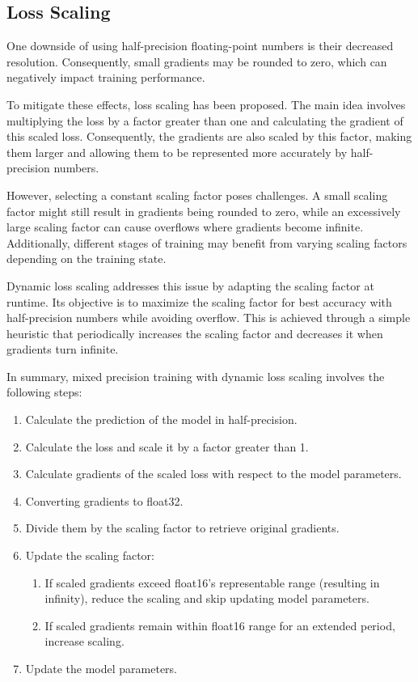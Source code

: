 \documentclass[logo]{dsme}
\begin{document}
\subsection{Loss Scaling}
One downside of using half-precision floating-point numbers is their decreased resolution. 
Consequently, small gradients may be rounded to zero, which can negatively impact training performance.

To mitigate these effects, loss scaling has been proposed. 
The main idea involves multiplying the loss by a factor greater than one and calculating the gradient of this scaled loss. 
Consequently, the gradients are also scaled by this factor, making them larger and allowing them to be represented more accurately by half-precision numbers.

However, selecting a constant scaling factor poses challenges. 
A small scaling factor might still result in gradients being rounded to zero, while an excessively large scaling factor can cause overflows where gradients become infinite. 
Additionally, different stages of training may benefit from varying scaling factors depending on the training state.

Dynamic loss scaling addresses this issue by adapting the scaling factor at runtime.
Its objective is to maximize the scaling factor for best accuracy with half-precision numbers while avoiding overflow. 
This is achieved through a simple heuristic that periodically increases the scaling factor and decreases it when gradients turn infinite.

In summary, mixed precision training with dynamic loss scaling involves the following steps:
\begin{enumerate}
    \item Calculate the prediction of the model in half-precision.
    \item Calculate the loss and scale it by a factor greater than 1.
    \item Calculate gradients of the scaled loss with respect to the model parameters.
    \item Converting gradients to float32.
    \item Divide them by the scaling factor to retrieve original gradients.
    \item Update the scaling factor:
    \begin{enumerate}[label=(\alph*)]
        \item If scaled gradients exceed float16's representable range (resulting in infinity), reduce the scaling and skip updating model parameters. 
        \item If scaled gradients remain within float16 range for an extended period, increase scaling.
    \end{enumerate}
    \item Update the model parameters.
\end{enumerate}
\end{document}
